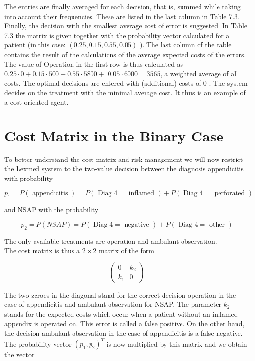 \documentclass[10pt]{article}
\begin{document}
The entries are finally averaged for each decision, that is, summed while taking into account their frequencies. These are listed in the last column in Table 7.3. Finally, the decision with the smallest average cost of error is suggested. In Table 7.3 the matrix is given together with the probability vector calculated for a patient (in this case: $(0.25,0.15,0.55,0.05)$ ). The last column of the table contains the result of the calculations of the average expected costs of the errors. The value of Operation in the first row is thus calculated as $0.25 \cdot 0+0.15 \cdot 500+0.55 \cdot 5800+$ $0.05 \cdot 6000=3565$, a weighted average of all costs. The optimal decisions are entered with (additional) costs of 0 . The system decides on the treatment with the minimal average cost. It thus is an example of a cost-oriented agent.

\section*{Cost Matrix in the Binary Case}
To better understand the cost matrix and risk management we will now restrict the Lexmed system to the two-value decision between the diagnosis appendicitis with probability

$$
p_{1}=P(\text { appendicitis })=P(\text { Diag } 4=\text { inflamed })+P(\text { Diag } 4=\text { perforated })
$$

and NSAP with the probability

$$
p_{2}=P(N S A P)=P(\text { Diag } 4=\text { negative })+P(\text { Diag } 4=\text { other })
$$

The only available treatments are operation and ambulant observation.\\
The cost matrix is thus a $2 \times 2$ matrix of the form

$$
\left(\begin{array}{cc}
0 & k_{2} \\
k_{1} & 0
\end{array}\right)
$$

The two zeroes in the diagonal stand for the correct decision operation in the case of appendicitis and ambulant observation for NSAP. The parameter $k_{2}$ stands for the expected costs which occur when a patient without an inflamed appendix is operated on. This error is called a false positive. On the other hand, the decision ambulant observation in the case of appendicitis is a false negative. The probability vector $\left(p_{1}, p_{2}\right)^{T}$ is now multiplied by this matrix and we obtain the vector
\end{document}
